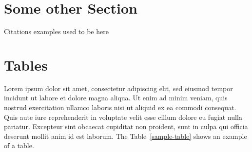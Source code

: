 \documentclass{article}
\begin{document}

\section{Some other Section}

Citations examples used to be here


\section{Tables}

Lorem ipsum dolor sit amet, consectetur adipiscing elit, sed eiusmod tempor incidunt ut labore et dolore magna aliqua. Ut enim ad minim veniam, quis nostrud exercitation ullamco laboris nisi ut aliquid ex ea commodi consequat. Quis aute iure reprehenderit in voluptate velit esse cillum dolore eu fugiat nulla pariatur. Excepteur sint obcaecat cupiditat non proident, sunt in culpa qui officia deserunt mollit anim id est laborum. The Table~\ref{sample-table} shows an example of a table.
\end{document}
